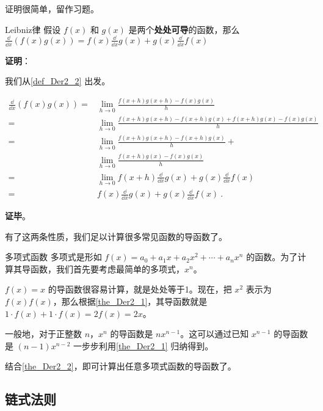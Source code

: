 证明很简单，留作习题。

\begin{theorem}{Leibniz律}\label{the_Der2_1}
假设 $f(x)$ 和 $g(x)$ 是两个\textbf{处处可导}的函数，那么 $\frac{\dd}{\dd x}(f(x)g(x))=f(x)\frac{\dd}{\dd x}g(x)+g(x)\frac{\dd}{\dd x}f(x)$
\end{theorem}

\textbf{证明}：

我们从\autoref{def_Der2_2} 出发。

\begin{equation}
\begin{aligned}
\frac{\dd}{\dd x}(f(x)g(x))=&\lim\limits_{h\to 0}\frac{f(x+h)g(x+h)-f(x)g(x)}{h}\\
=&\lim\limits_{h\to 0}\frac{f(x+h)g(x+h)-f(x+h)g(x)+f(x+h)g(x)-f(x)g(x)}{h}\\
=&\lim\limits_{h\to 0}\frac{f(x+h)g(x+h)-f(x+h)g(x)}{h}+\\&\lim\limits_{h\to 0}\frac{f(x+h)g(x)-f(x)g(x)}{h}\\
=&\lim\limits_{h\to 0}f(x+h)\frac{\dd}{\dd x}g(x)+g(x)\frac{\dd}{\dd x}f(x)\\
=&f(x)\frac{\dd}{\dd x}g(x)+g(x)\frac{\dd}{\dd x}f(x)~.
\end{aligned}
\end{equation}

\textbf{证毕}。

有了这两条性质，我们足以计算很多常见函数的导函数了。

\begin{example}{多项式函数}
多项式是形如 $f(x)=a_0+a_1x+a_2x^2+\cdots+a_nx^n$ 的函数。为了计算其导函数，我们首先要考虑最简单的多项式，$x^n$。

$f(x)=x$ 的导函数很容易计算，就是处处等于1。现在，把 $x^2$ 表示为 $f(x)f(x)$，那么根据\autoref{the_Der2_1}，其导函数就是 $1\cdot f(x)+1\cdot f(x)=2f(x)=2x$。

一般地，对于正整数 $n$，$x^n$ 的导函数是 $nx^{n-1}$。这可以通过已知 $x^{n-1}$ 的导函数是 $(n-1)x^{n-2}$ 一步步利用\autoref{the_Der2_1} 归纳得到。

结合\autoref{the_Der2_2}，即可计算出任意多项式函数的导函数了。
\end{example}


\subsection{链式法则}













